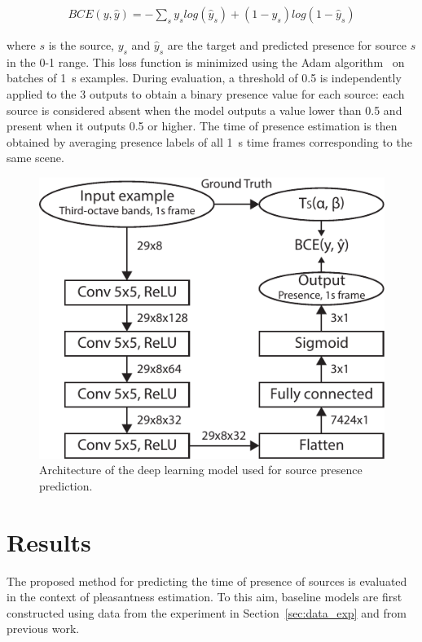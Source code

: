 \documentclass[twocolumn]{article}
\begin{document}
\begin{align}
BCE(y, \hat y) = -\sum_s y_s log\left(\hat y_s\right) + (1-y_s) log\left(1-\hat y_s\right)
\end{align}

where $s$ is the source, $y_s$ and $\hat y_s$ are the target and predicted presence for source $s$ in the 0-1 range. This loss function is minimized using the Adam algorithm~\cite{kingma2015} on batches of 1~s examples. During evaluation, a threshold of 0.5 is independently applied to the 3 outputs to obtain a binary presence value for each source: each source is considered absent when the model outputs a value lower than 0.5 and present when it outputs 0.5 or higher. The time of presence estimation is then obtained by averaging presence labels of all 1~s time frames corresponding to the same scene.

\begin{figure}[t]
    \centering
    \includegraphics[width=\columnwidth]{figures/deep_arch.pdf}
    \caption{Architecture of the deep learning model used for source presence prediction.}\label{fig:deep_arch}
\end{figure}

\section{Results}
\label{sec:results}

The proposed method for predicting the time of presence of sources is evaluated in the context of pleasantness estimation. To this aim, baseline models are first constructed using data from the experiment in Section~\ref{sec:data_exp} and from previous work.
\end{document}
